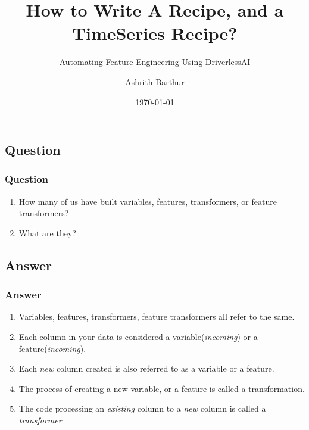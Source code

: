 \documentclass[11pt,
aspectratio=169,
hyperref={colorlinks}
]{beamer}
\author{Ashrith Barthur}
\title{How to Write A Recipe, and a TimeSeries Recipe?}
\subtitle{Automating Feature Engineering Using DriverlessAI}
\institute{\href{https://www.h2o.ai}{H\textsubscript{2}O.ai}}
\date{\today}
\begin{document}
\maketitle





\subsection{Question}
\begin{frame}
        \frametitle{Question}
        \begin{enumerate}
                \item How many of us have built variables, features, transformers, or feature transformers?
                \item What are they?
        \end{enumerate}
\end{frame}
\subsection{Answer}
\begin{frame}
        \frametitle{Answer}
        \begin{enumerate}
                \item Variables, features, transformers, feature transformers all refer to the same.
                \item Each column in your data is considered a variable(\textit{incoming}) or a feature(\textit{incoming}).
                \item Each \textit{new} column created is also referred to as a variable or a feature.
                \item The process of creating a new variable, or a feature is called a transformation. 
                \item The code processing an \textit{existing} column to a \textit{new} column is called a \textit{transformer}.
        \end{enumerate}
\end{frame}
\end{document}
